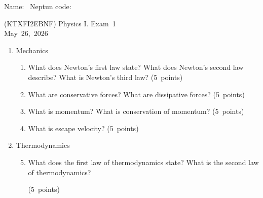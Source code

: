 \documentclass[a4paper,12pt]{letter}
\begin{document}
Name: \hrulefill\ Neptun code: \hrulefill

\bigskip

\begin{center}
(KTXFI2EBNF) Physics I. Exam~1 \\
May~26,~2026
\end{center}

\bigskip
 
\begin{enumerate}[label=\Roman*.]
   
\item Mechanics

\begin{enumerate}[label=\arabic*.]
\setcounter{enumii}{0} %

\item What does Newton’s first law state? What does Newton’s second law describe? What is Newton’s third law? \hfill (5~points)


\item What are conservative forces? What are dissipative forces? \hfill (5~points)


\item What is momentum? What is conservation of momentum? \hfill (5~points)


  
\item What is escape velocity? \hfill (5~points)

  
\end{enumerate}


\item Thermodynamics

\begin{enumerate}[label=\arabic*.]
\setcounter{enumii}{4} %

\item What does the first law of thermodynamics state? What is the second law of thermodynamics?

\hfill (5~points)



\end{enumerate}
\end{enumerate}
\end{document}
